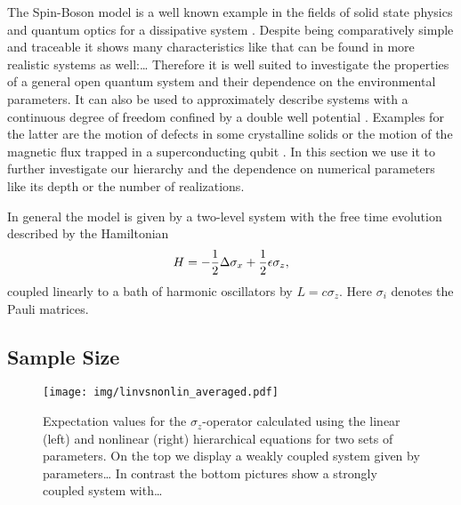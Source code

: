 The Spin-Boson model is a well known example in the fields of solid state physics and quantum optics for a dissipative system \cite{}.
Despite being comparatively simple and traceable it shows many characteristics like that can be found in more realistic systems as well:\dots
Therefore it is well suited to investigate the properties of a general open quantum system and their dependence on the environmental parameters.
It can also be used to approximately describe systems with a continuous degree of freedom confined by a double well potential \cite{Le87_spinboson}.
Examples for the latter are the motion of defects in some crystalline solids or the motion of the magnetic flux trapped in a superconducting qubit \cite{CaLe83_diss_system}.
In this section we use it to further investigate our hierarchy and the dependence on numerical parameters like its depth or the number of realizations.

In general the model is given by a two-level system with the free time evolution described by the Hamiltonian
\begin{equation*}
  H = - \frac{1}{2}\Delta \sigma_x + \frac{1}{2} \epsilon \sigma_z,
\end{equation*}
coupled linearly to a bath of harmonic oscillators by $L=c \sigma_z$.
Here $\sigma_i$ denotes the Pauli matrices.

\subsection{Sample Size}
\label{sub:num.spin_boson.sample_size}
%


\begin{figure}[p]
  \centering
  \texttt{[image: img/linvsnonlin\_averaged.pdf]}
  \caption{%
    Expectation values for the $\sigma_z$-operator calculated using the linear (left) and nonlinear (right) hierarchical equations for two sets of parameters.
    On the top we display a weakly coupled system given by parameters\dots
    In contrast the bottom pictures show a strongly coupled system with\dots
  }
  \label{fig:num.linvsnonlin}
\end{figure}



